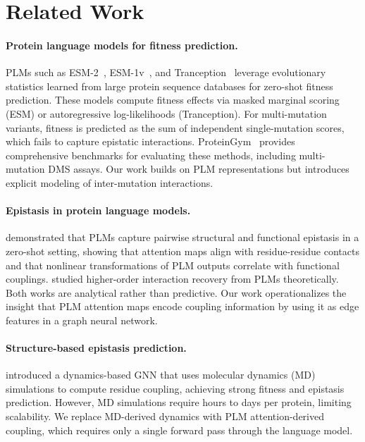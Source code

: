 \documentclass{article}
\begin{document}
\section{Related Work}
\label{sec:related}

\paragraph{Protein language models for fitness prediction.}
PLMs such as ESM-2~\citep{lin2023evolutionary}, ESM-1v~\citep{meier2021language}, and Tranception~\citep{notin2022tranception} leverage evolutionary statistics learned from large protein sequence databases for zero-shot fitness prediction.
These models compute fitness effects via masked marginal scoring (ESM) or autoregressive log-likelihoods (Tranception).
For multi-mutation variants, fitness is predicted as the sum of independent single-mutation scores, which fails to capture epistatic interactions.
ProteinGym~\citep{notin2023proteingym} provides comprehensive benchmarks for evaluating these methods, including multi-mutation DMS assays.
Our work builds on PLM representations but introduces explicit modeling of inter-mutation interactions.

\paragraph{Epistasis in protein language models.}
\citet{nambiar2025plm_epistasis} demonstrated that PLMs capture pairwise structural and functional epistasis in a zero-shot setting, showing that attention maps align with residue-residue contacts and that nonlinear transformations of PLM outputs correlate with functional couplings.
\citet{tsui2024recovering} studied higher-order interaction recovery from PLMs theoretically.
Both works are analytical rather than predictive.
Our work operationalizes the insight that PLM attention maps encode coupling information by using it as edge features in a graph neural network.

\paragraph{Structure-based epistasis prediction.}
\citet{huynh2025dynamics} introduced a dynamics-based GNN that uses molecular dynamics (MD) simulations to compute residue coupling, achieving strong fitness and epistasis prediction.
However, MD simulations require hours to days per protein, limiting scalability.
We replace MD-derived dynamics with PLM attention-derived coupling, which requires only a single forward pass through the language model.
\end{document}
